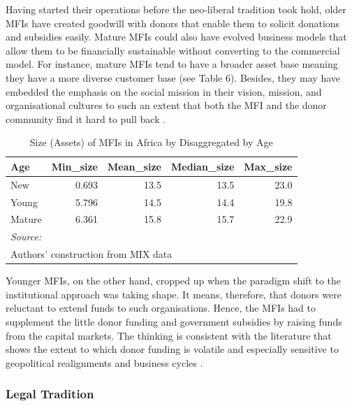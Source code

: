 \documentclass[a4paper, nobind]{templates/ociamthesis}
\begin{document}
Having started their operations before the neo-liberal tradition took hold, older MFIs have created goodwill with donors that enable them to solicit donations and subsidies easily. Mature MFIs could also have evolved business models that allow them to be financially sustainable without converting to the commercial model. For instance, mature MFIs tend to have a broader asset base meaning they have a more diverse customer base (see Table 6). Besides, they may have embedded the emphasis on the social mission in their vision, mission, and organisational cultures to such an extent that both the MFI and the donor community find it hard to pull back \autocite{ramus2017,berbegal2019impact}.

\begin{table}

\caption{\label{tab:unnamed-chunk-36}Size (Assets) of MFIs in Africa by Disaggregated by Age}
\centering
\begin{tabular}[t]{lrrrr}
\toprule
Age & Min\_size & Mean\_size & Median\_size & Max\_size\\
\midrule
New & 0.693 & 13.5 & 13.5 & 23.0\\
Young & 5.796 & 14.5 & 14.4 & 19.8\\
Mature & 6.361 & 15.8 & 15.7 & 22.9\\
\bottomrule
\multicolumn{5}{l}{\rule{0pt}{1em}\textit{Source: }}\\
\multicolumn{5}{l}{\rule{0pt}{1em}Authors' construction from MIX data}\\
\end{tabular}
\end{table}

Younger MFIs, on the other hand, cropped up when the paradigm shift to the institutional approach was taking shape. It means, therefore, that donors were reluctant to extend funds to such organisations. Hence, the MFIs had to supplement the little donor funding and government subsidies by raising funds from the capital markets. The thinking is consistent with the literature that shows the extent to which donor funding is volatile and especially sensitive to geopolitical realignments \autocite{garmaise2013cheap,d2017aid} and business cycles \autocite{wagner2013vulnerability}.

\hypertarget{legal-tradition}{%
\subsubsection{Legal Tradition}\label{legal-tradition}}
\end{document}
